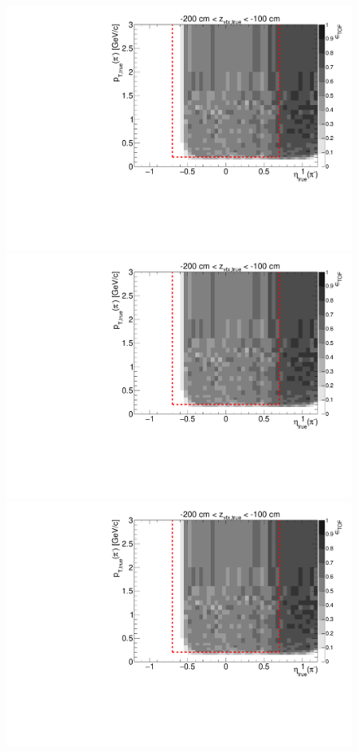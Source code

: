 \begin{figure}[hb]
{  \includegraphics[width=\linewidth,page=6]{graphics/eff/Eff2D_TOF_pion_Minus.pdf}\\
  \includegraphics[width=\linewidth,page=8]{graphics/eff/Eff2D_TOF_pion_Minus.pdf}\\
  \includegraphics[width=\linewidth,page=10]{graphics/eff/Eff2D_TOF_pion_Minus.pdf}
}%
\end{figure}
